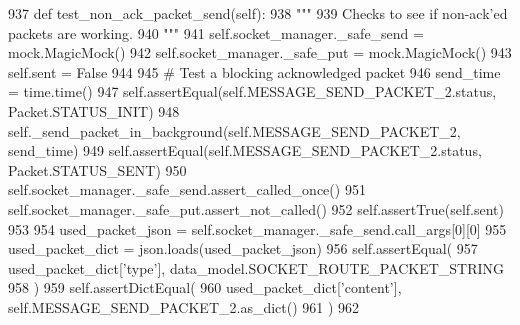 \begin{DoxyCode}
937     \textcolor{keyword}{def }test\_non\_ack\_packet\_send(self):
938         \textcolor{stringliteral}{"""}
939 \textcolor{stringliteral}{        Checks to see if non-ack'ed packets are working.}
940 \textcolor{stringliteral}{        """}
941         self.socket\_manager.\_safe\_send = mock.MagicMock()
942         self.socket\_manager.\_safe\_put = mock.MagicMock()
943         self.sent = \textcolor{keyword}{False}
944 
945         \textcolor{comment}{# Test a blocking acknowledged packet}
946         send\_time = time.time()
947         self.assertEqual(self.MESSAGE\_SEND\_PACKET\_2.status, Packet.STATUS\_INIT)
948         self.\_send\_packet\_in\_background(self.MESSAGE\_SEND\_PACKET\_2, send\_time)
949         self.assertEqual(self.MESSAGE\_SEND\_PACKET\_2.status, Packet.STATUS\_SENT)
950         self.socket\_manager.\_safe\_send.assert\_called\_once()
951         self.socket\_manager.\_safe\_put.assert\_not\_called()
952         self.assertTrue(self.sent)
953 
954         used\_packet\_json = self.socket\_manager.\_safe\_send.call\_args[0][0]
955         used\_packet\_dict = json.loads(used\_packet\_json)
956         self.assertEqual(
957             used\_packet\_dict[\textcolor{stringliteral}{'type'}], data\_model.SOCKET\_ROUTE\_PACKET\_STRING
958         )
959         self.assertDictEqual(
960             used\_packet\_dict[\textcolor{stringliteral}{'content'}], self.MESSAGE\_SEND\_PACKET\_2.as\_dict()
961         )
962 
\end{DoxyCode}
\mbox{\label{classparlai_1_1mturk_1_1core_1_1legacy__2018_1_1test_1_1test__socket__manager_1_1TestSocketManagerRoutingFunctionality_a401c9aaa24e9b643bdcb43ee5e98c0cb}} 
